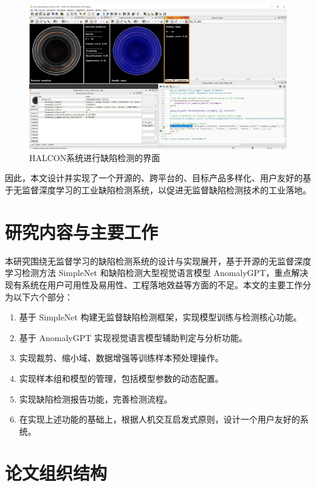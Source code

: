 \documentclass[
  ]{njuthesis}
\begin{document}
\begin{figure}[ht]
  \centering
  \includegraphics[width=\textwidth]{images/HALCON系统界面.png}
  \caption{HALCON系统进行缺陷检测的界面}
  \label{HALCON}
\end{figure}

因此，本文设计并实现了一个开源的、跨平台的、目标产品多样化、用户友好的基于无监督深度学习的工业缺陷检测系统，以促进无监督缺陷检测技术的工业落地。

\section{研究内容与主要工作}

本研究围绕无监督学习的缺陷检测系统的设计与实现展开，基于开源的无监督深度学习检测方法 SimpleNet 和缺陷检测大型视觉语言模型 AnomalyGPT，重点解决现有系统在用户可用性及易用性、工程落地效益等方面的不足。本文的主要工作分为以下六个部分：  

\begin{enumerate}
    \item 基于 SimpleNet 构建无监督缺陷检测框架，实现模型训练与检测核心功能。
    \item 基于 AnomalyGPT 实现视觉语言模型辅助判定与分析功能。
    \item 实现裁剪、缩小域、数据增强等训练样本预处理操作。
    \item 实现样本组和模型的管理，包括模型参数的动态配置。
    \item 实现缺陷检测报告功能，完善检测流程。
    \item 在实现上述功能的基础上，根据人机交互启发式原则，设计一个用户友好的系统。
\end{enumerate}

\section{论文组织结构}
\end{document}
